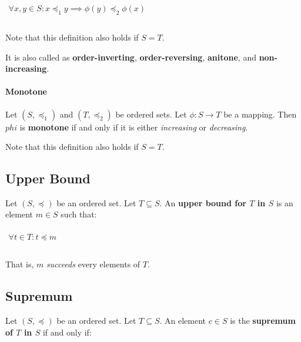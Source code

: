 \begin{math}
  \begin{array}{c}
    \\
    \forall x, y \in S: x \preceq_1 y \implies \phi(y) \preceq_2 \phi(x) \\
    \\
  \end{array}
\end{math}

Note that this definition also holds if $S = T$.

It is also called as \textbf{order-inverting},
\textbf{order-reversing}, \textbf{anitone}, and
\textbf{non-increasing}.


\paragraph{Monotone}
\label{sec:monotone}


Let $(S, \preceq_1)$ and $(T, \preceq_2)$ be ordered sets. Let
$\phi: S \to T$ be a mapping. Then $phi$ is \textbf{monotone} if and
only if it is either \textit{increasing} or \textit{decreasing}.

Note that this definition also holds if $S = T$.




\subsection{Upper Bound}
\label{sec:upper-bound}

Let $(S, \preceq)$ be an ordered set. Let $T \subseteq S$. An
\textbf{upper bound for $T$ in $S$} is an element $m \in S$ such that:

\begin{math}
  \begin{array}{c}
    \\
    \forall t \in T : t \preceq m\\
    \\
  \end{array}
\end{math}

That is, $m$ \textit{succeeds} every elements of $T$.



\subsection{Supremum}
\label{sec:supremum}

Let $(S, \preceq)$ be an ordered set. Let $T \subseteq S$. An element
$c \in S$ is the \textbf{supremum of $T$ in $S$} if and only if:

